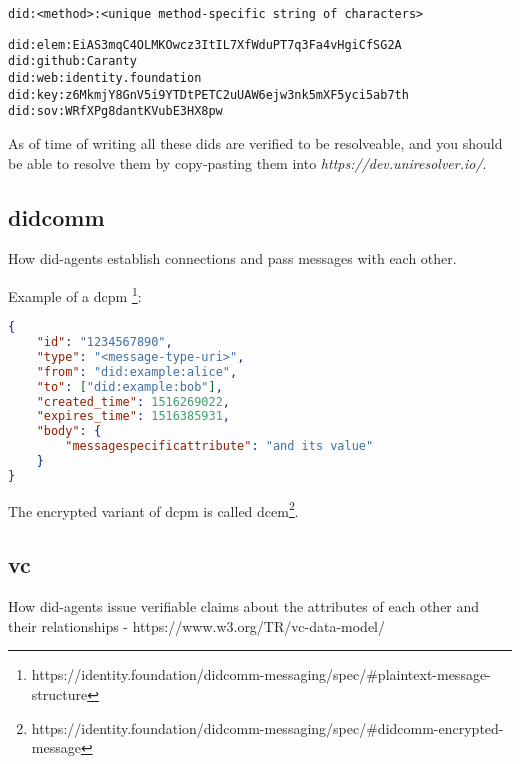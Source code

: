 \begin{lstlisting}[caption={DID-signature}]
did:<method>:<unique method-specific string of characters>
\end{lstlisting}

\begin{lstlisting}[caption={Depending on the DID-method, different DIDs may look very different from each other.}]
did:elem:EiAS3mqC4OLMKOwcz3ItIL7XfWduPT7q3Fa4vHgiCfSG2A
did:github:Caranty
did:web:identity.foundation
did:key:z6MkmjY8GnV5i9YTDtPETC2uUAW6ejw3nk5mXF5yci5ab7th
did:sov:WRfXPg8dantKVubE3HX8pw

\end{lstlisting}

As of time of writing all these \acrshort{dids} are verified to be resolveable, and you should be able to resolve them by copy-pasting them into \textit{https://dev.uniresolver.io/\cite{UniversalResolver}}.

\newpage




\subsection{\acrfull{didcomm}}

How \acrshort{did}-agents establish connections and pass messages with each other.


Example of a \acrfull{dcpm} \footnote{https://identity.foundation/didcomm-messaging/spec/\#plaintext-message-structure}:
\begin{lstlisting}[language=json]
{
    "id": "1234567890",
    "type": "<message-type-uri>",
    "from": "did:example:alice",
    "to": ["did:example:bob"],
    "created_time": 1516269022,
    "expires_time": 1516385931,
    "body": {
    	"messagespecificattribute": "and its value"
    }
}
\end{lstlisting}

The encrypted variant of \acrfull{dcpm} is called \acrfull{dcem}\footnote{https://identity.foundation/didcomm-messaging/spec/\#didcomm-encrypted-message}.



\newpage

\subsection{\acrfull{vc}} 

How \acrshort{did}-agents issue verifiable claims about the attributes of each other and their relationships - https://www.w3.org/TR/vc-data-model/ 

